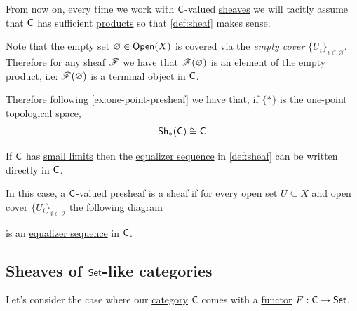 \documentclass[../../../main]{subfiles}
\begin{document}
\begin{remark}
  From now on, every time we work with \(\mathsf{C}\)-valued \hyperref[def:sheaf]{sheaves} we will tacitly assume that \(\mathsf{C}\) has sufficient \hyperref[def:categorical-product]{products} so that \autoref{def:sheaf} makes sense.
\end{remark}

\begin{remark} \label{remark:empty-set-sheaf}
  Note that the empty set \(\varnothing \in \mathsf{Open}(X)\) is covered via the \textit{empty cover} \(\{U_{i}\}_{i \in \varnothing}\).
  Therefore for any \hyperref[def:sheaf]{sheaf} \(\mathscr{F}\) we have that \(\mathscr{F}(\varnothing)\) is an element of the empty \hyperref[def:categorical-product]{product}, i.e: \(\mathscr{F}(\varnothing)\) is a \hyperref[def:initial-terminal-object]{terminal object} in \(\mathsf{C}\).

  Therefore following \autoref{ex:one-point-presheaf} we have that, if \(\{\ast\}\) is the one-point topological space,
  \begin{align*}
    \mathsf{Sh}_{{\ast}}(\mathsf{C}) \cong \mathsf{C}
  \end{align*}
\end{remark}

\begin{remark} \label{remark:small-limits-sheaf}
  If \(\mathsf{C}\) has \hyperref[def:categorical-limit]{small limits} then the \hyperref[def:equaliser]{equalizer sequence} in \autoref{def:sheaf} can be written directly in \(\mathsf{C}\).

  In this case, a \(\mathsf{C}\)-valued \hyperref[def:presheaf]{presheaf} is a \hyperref[def:sheaf]{sheaf} if for every open set \(U \subseteq X\) and open cover \(\{U_{i}\}_{i \in \mathcal{I}}\) the following diagram
  \begin{center}
  \end{center}
  is an \hyperref[def:equaliser]{equalizer sequence} in \(\mathsf{C}\).
\end{remark}


\subsection{Sheaves of \(\mathsf{Set}\)-like categories} \label{ssec:concrete-category-sheaf}
Let's consider the case where our \hyperref[def:category]{category} \(\mathsf{C}\) comes with a \hyperref[def:functor]{functor} \(F: \mathsf{C} \to \mathsf{Set}\).
\end{document}
